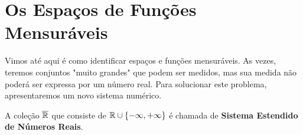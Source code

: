                             
        
    
\section{Os Espaços de Funções Mensuráveis}
    Vimos até aqui é como identificar espaços e funções mensuráveis.
    As vezes, teremos conjuntos "muito grandes" que podem ser medidos, mas sua medida não poderá ser expressa por um número real.
    Para solucionar este problema, apresentaremos um novo sistema numérico.

    \begin{definition}
    \label{def:reta-estendida}
        A coleção $\operatorname{\overline{\mathbb{R}}}$ que consiste de $\mathbb{R} \cup \{-\infty, +\infty\}$ é chamada de \textbf{Sistema Estendido de Números Reais}.
    \end{definition}

